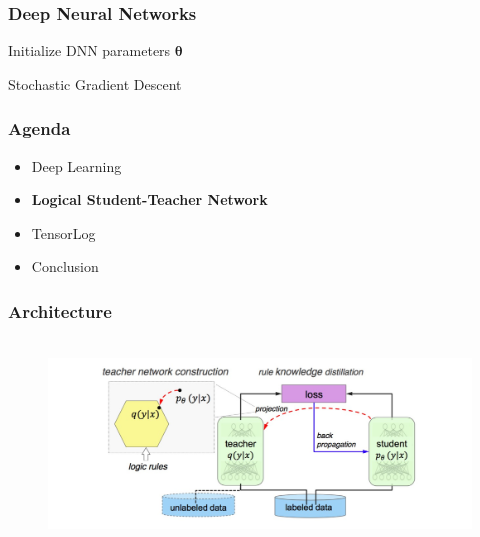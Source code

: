 \documentclass{beamer}
\begin{document}
\begin{frame}
\frametitle{Deep Neural Networks}
	\begin{algorithm}[H]
	Initialize DNN parameters $\boldsymbol{\theta}$ \\
	\caption{Stochastic Gradient Descent}
\end{algorithm}
\end{frame}

\begin{frame}
\frametitle{Agenda}
\begin{itemize}
	\item Deep Learning
	\item \textbf{Logical Student-Teacher Network}
	\item TensorLog
	\item Conclusion
\end{itemize}
\end{frame}

\begin{frame}
	\frametitle{Architecture}
	\begin{figure}
		\begin{center}
			\includegraphics[width=12cm, height=5.5cm]{teacher_dnn}
		\end{center}
	\end{figure}
\end{frame}
\end{document}
